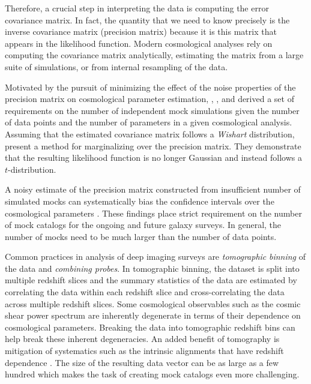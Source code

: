 Therefore, a crucial step in interpreting the data is computing the error covariance matrix. 
In fact, the quantity that we need to know precisely is the inverse covariance matrix (precision matrix) because it is this matrix that appears in the likelihood function. Modern cosmological analyses rely on computing the covariance matrix analytically, estimating the matrix from a large suite of simulations, or from internal resampling of the data. 

Motivated by the pursuit of minimizing the effect of the noise properties of the precision matrix on 
cosmological parameter estimation, \citet{dodelson2013}, \citet{taylor2013}, and \citet{taylor2014} derived a set of requirements 
on the number of independent mock simulations given the number of data points and the number of parameters 
in a given cosmological analysis. Assuming that the estimated covariance matrix follows a \emph{Wishart} distribution, 
\citet{Sellentin:2016a} present a method for marginalizing over the precision matrix. They demonstrate that the 
resulting likelihood function is no longer Gaussian and instead follows a $t$-distribution.

A noisy estimate of the precision matrix 
constructed from insufficient number of simulated mocks can systematically bias the confidence 
intervals over the cosmological parameters \citep{dodelson2013,Sellentin:2017a}. These findings place strict requirement on the number of 
mock catalogs for the ongoing and future galaxy surveys. In general, the number of mocks need to be much larger than 
the number of data points.

Common practices in analysis of deep imaging surveys are \emph{tomographic} \emph{binning} of the data and \emph{combining probes}.
In tomographic binning, the dataset is split into multiple redshift slices and the summary statistics of 
the data are estimated by correlating the data within each redshift slice and cross-correlating the data across 
multiple redshift slices. Some cosmological observables such as the cosmic shear power spectrum are inherently degenerate in terms 
of their dependence on cosmological parameters. Breaking the data into tomographic redshift bins can help break these inherent degeneracies.
An added benefit of tomography is mitigation of systematics such as the intrinsic alignments that have redshift dependence \citep{eifler2015,krause2016}. 
The size of the resulting data vector can be as large as a few hundred which makes the task of creating mock catalogs even more challenging. 

